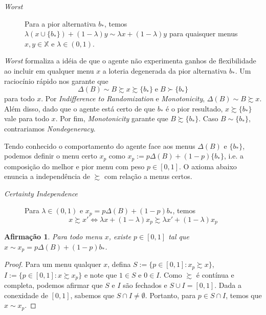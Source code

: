 \documentclass[11pt, a4paper]{article}
\theoremstyle{nonumberplain}
\newtheorem{proof}{Dem.}
\theoremstyle{plain}
\newtheorem{claim}{Afirmação}
\theoremstyle{plain}
\begin{document}
\begin{description}
\item[\textit{Worst}] Para a pior alternativa $b_*$, temos $\lambda\left(x\cup \{b_*\}\right)+(1-\lambda)y\sim \lambda x + (1-\lambda)y$ para quaisquer menus $x,y\in \mathbb{X}$ e $\lambda\in (0,1)$. 
\end{description}

\textit{Worst} formaliza a idéia de que o agente não experimenta ganhos de flexibilidade ao incluir  em qualquer menu $x$ a loteria degenerada da pior alternativa $b_*$. Um raciocínio rápido nos garante que $$\Delta(B)\sim B\succsim x\succsim \{b_*\} \; \text{e} \; B\succ \{b_*\}$$ para todo $x$. Por \textit{Indifference to Randomization} e \textit{Monotonicity}, $\Delta(B)\sim B \succsim x$. Além disso, dado que o agente está certo de que $b_*$ é o pior resultado, $x\succsim \{b_*\}$ vale para todo $x$. Por fim, \textit{Monotonicity} garante que $B\succsim \{b_*\}$. Caso $B \sim \{b_*\}$, contrariamos \textit{Nondegeneracy}. 

Tendo conhecido o comportamento do agente face aos menus $\Delta(B)$ e $\{b_*\}$, podemos definir o menu certo $x_p$ como $x_p:=p\Delta(B)+(1-p)\{b_*\}$, i.e. a composição do melhor e pior menu com peso $p\in [0,1]$. O axioma abaixo enuncia a independência de $\succsim$ com relação a menus certos.

\begin{description}
\item [\textit{Certainty Independence}] Para $\lambda\in (0,1)$ e $x_p=p\Delta(B)+(1-p)b_*$, temos $$x\succsim x' \Leftrightarrow \lambda x +(1-\lambda)x_p\succsim \lambda x' + (1-\lambda)x_p$$ 

\end{description}



\begin{claim}Para todo menu $x$, existe $p\in[0,1]$ tal que $x\sim x_p=p\Delta(B)+(1-p)b_*$. \end{claim}
\begin{proof}
Para um menu qualquer $x$, defina $S:=\{p\in[0,1] : x_p\succsim x\}$, $I:=\{p\in[0,1] : x\succsim x_p\}$ e note que $1\in S$ e $0\in I$. Como $\succsim$ é contínua e completa, podemos afirmar que $S$ e $I$ são fechados e $S\cup I=[0,1]$. Dada a conexidade de $[0,1]$, sabemos que $S\cap I\neq \emptyset$. Portanto, para $p\in S\cap I$, temos que $x\sim x_p$.   
\end{proof}
\end{document}
